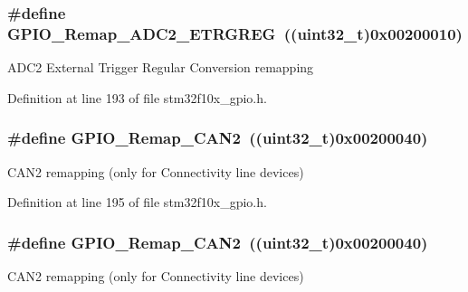 \subsubsection[{\texorpdfstring{G\+P\+I\+O\+\_\+\+Remap\+\_\+\+A\+D\+C2\+\_\+\+E\+T\+R\+G\+R\+EG}{GPIO_Remap_ADC2_ETRGREG}}]{\setlength{\rightskip}{0pt plus 5cm}\#define G\+P\+I\+O\+\_\+\+Remap\+\_\+\+A\+D\+C2\+\_\+\+E\+T\+R\+G\+R\+EG~(({\bf uint32\+\_\+t})0x00200010)}\hypertarget{group___g_p_i_o___remap__define_gaa782a0c482f34507c82e4cd639bb747e}{}\label{group___g_p_i_o___remap__define_gaa782a0c482f34507c82e4cd639bb747e}
A\+D\+C2 External Trigger Regular Conversion remapping 

Definition at line 193 of file stm32f10x\+\_\+gpio.\+h.

\subsubsection[{\texorpdfstring{G\+P\+I\+O\+\_\+\+Remap\+\_\+\+C\+A\+N2}{GPIO_Remap_CAN2}}]{\setlength{\rightskip}{0pt plus 5cm}\#define G\+P\+I\+O\+\_\+\+Remap\+\_\+\+C\+A\+N2~(({\bf uint32\+\_\+t})0x00200040)}\hypertarget{group___g_p_i_o___remap__define_ga14c09a5050063b703fa07181afc56ee6}{}\label{group___g_p_i_o___remap__define_ga14c09a5050063b703fa07181afc56ee6}
C\+A\+N2 remapping (only for Connectivity line devices) 

Definition at line 195 of file stm32f10x\+\_\+gpio.\+h.

\subsubsection[{\texorpdfstring{G\+P\+I\+O\+\_\+\+Remap\+\_\+\+C\+A\+N2}{GPIO_Remap_CAN2}}]{\setlength{\rightskip}{0pt plus 5cm}\#define G\+P\+I\+O\+\_\+\+Remap\+\_\+\+C\+A\+N2~(({\bf uint32\+\_\+t})0x00200040)}\hypertarget{group___g_p_i_o___remap__define_ga14c09a5050063b703fa07181afc56ee6}{}\label{group___g_p_i_o___remap__define_ga14c09a5050063b703fa07181afc56ee6}
C\+A\+N2 remapping (only for Connectivity line devices) 

